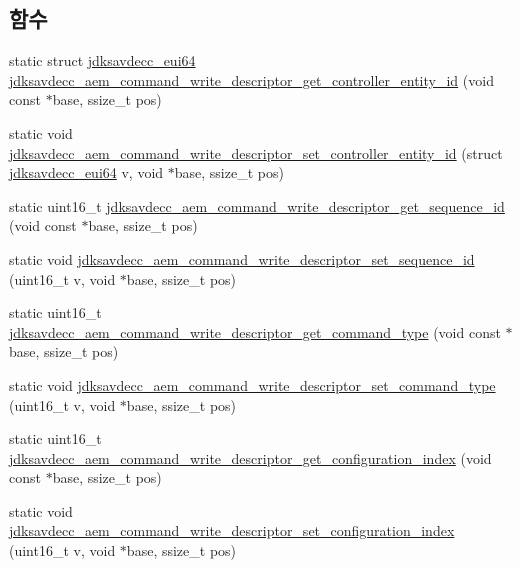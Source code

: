 \subsection*{함수}
\begin{DoxyCompactItemize}
\item 
static struct \hyperlink{structjdksavdecc__eui64}{jdksavdecc\+\_\+eui64} \hyperlink{group__command__write__descriptor_ga213396989fbdc3d2c1c89f9d5c54736c}{jdksavdecc\+\_\+aem\+\_\+command\+\_\+write\+\_\+descriptor\+\_\+get\+\_\+controller\+\_\+entity\+\_\+id} (void const $\ast$base, ssize\+\_\+t pos)
\item 
static void \hyperlink{group__command__write__descriptor_ga639223c05bfc234978b324d89f8e5fc9}{jdksavdecc\+\_\+aem\+\_\+command\+\_\+write\+\_\+descriptor\+\_\+set\+\_\+controller\+\_\+entity\+\_\+id} (struct \hyperlink{structjdksavdecc__eui64}{jdksavdecc\+\_\+eui64} v, void $\ast$base, ssize\+\_\+t pos)
\item 
static uint16\+\_\+t \hyperlink{group__command__write__descriptor_ga3e34eadcf8ebcca5b899083a000788fd}{jdksavdecc\+\_\+aem\+\_\+command\+\_\+write\+\_\+descriptor\+\_\+get\+\_\+sequence\+\_\+id} (void const $\ast$base, ssize\+\_\+t pos)
\item 
static void \hyperlink{group__command__write__descriptor_gaa771ea66d09484c72bd87b9c9a50ecab}{jdksavdecc\+\_\+aem\+\_\+command\+\_\+write\+\_\+descriptor\+\_\+set\+\_\+sequence\+\_\+id} (uint16\+\_\+t v, void $\ast$base, ssize\+\_\+t pos)
\item 
static uint16\+\_\+t \hyperlink{group__command__write__descriptor_ga4e9e416bf30e24c312b9b7b2cedee008}{jdksavdecc\+\_\+aem\+\_\+command\+\_\+write\+\_\+descriptor\+\_\+get\+\_\+command\+\_\+type} (void const $\ast$base, ssize\+\_\+t pos)
\item 
static void \hyperlink{group__command__write__descriptor_ga08e3813121a9d88a28c0d3a316f3b14d}{jdksavdecc\+\_\+aem\+\_\+command\+\_\+write\+\_\+descriptor\+\_\+set\+\_\+command\+\_\+type} (uint16\+\_\+t v, void $\ast$base, ssize\+\_\+t pos)
\item 
static uint16\+\_\+t \hyperlink{group__command__write__descriptor_gaacd8df9d64b3dd0b9a0453d67251fb2e}{jdksavdecc\+\_\+aem\+\_\+command\+\_\+write\+\_\+descriptor\+\_\+get\+\_\+configuration\+\_\+index} (void const $\ast$base, ssize\+\_\+t pos)
\item 
static void \hyperlink{group__command__write__descriptor_ga73d001e932056fc18f0902729bfdc4e7}{jdksavdecc\+\_\+aem\+\_\+command\+\_\+write\+\_\+descriptor\+\_\+set\+\_\+configuration\+\_\+index} (uint16\+\_\+t v, void $\ast$base, ssize\+\_\+t pos)

\end{DoxyCompactItemize}
